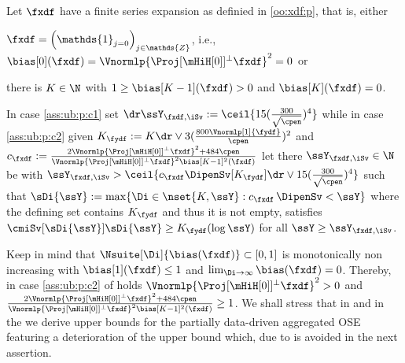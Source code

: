 \begin{as}\label{ass:ub:p}
Let $\fxdf$ have a finite series expansion as definied in \ref{oo:xdf:p}, that is, either
\begin{inparaenum}[i]\renewcommand{\theenumi}{\dgrau\rm(\alph{enumi})}
\item\label{ass:ub:p:c1}
	$\fxdf=\left(\mathds{1}_{j = 0}\right)_{j \in \mathds{Z}}$, i.e., $\bias[0](\fxdf)=\Vnormlp{\Proj[{\mHiH[0]}]^\perp\fxdf}^2=0$ or
\item\label{ass:ub:p:c2}
	there is $K\in\N$ with $1\geq \bias[{K-1}](\fxdf)>0$ and $\bias[K](\fxdf)=0$.
\end{inparaenum}
In case  \ref{ass:ub:p:c1} set $\dr\ssY_{\fxdf,\iSv}:=\ceil{15(\tfrac{300}{\sqrt{\cpen}})^4}$ while in case \ref{ass:ub:p:c2} given $K_{\fydf}:=K\dr\vee 3(\tfrac{800\Vnormlp[1]{\fydf}}{\cpen})^2$ and $c_{\fxdf}:=\tfrac{2\Vnormlp{\Proj[{\mHiH[0]}]^\perp\fxdf}^2+484\cpen}{\Vnormlp{\Proj[{\mHiH[0]}]^\perp\fxdf}^2\bias[{K-1}]^2(\fxdf)}$ let there $\ssY_{\fxdf,\iSv}\in\N$ be with $\ssY_{\fxdf,\iSv}>\ceil{c_{\fxdf}\DipenSv[K_{\fydf}]\dr\vee15(\tfrac{300}{\sqrt{\cpen}})^4}$ such that $\sDi{\ssY}:=\max\{\Di\in\nset{K,\ssY}:c_{\fxdf}\,\DipenSv<\ssY\}$ where the defining set contains $K_{\fydf}$ and thus it is not empty, satisfies $\cmiSv[\sDi{\ssY}]\sDi{\ssY}\geq K_{\fydf}(\log\ssY)$ for all $\ssY\geq \ssY_{\fxdf,\iSv}$.
\end{as}
\begin{rmk}\label{rem:ass:ub:p}
 Keep in mind that $\Nsuite[\Di]{\bias(\fxdf)}\subset[0,1]$ is monotonically non increasing with $\bias[1](\fxdf)\leq1$ and $\lim_{\Di\to\infty}\bias(\fxdf)=0$.
Thereby, in case \ref{ass:ub:p:c2} of  holds $\Vnormlp{\Proj[{\mHiH[0]}]^\perp\fxdf}^2>0$ and $\tfrac{2\Vnormlp{\Proj[{\mHiH[0]}]^\perp\fxdf}^2+484\cpen}{\Vnormlp{\Proj[{\mHiH[0]}]^\perp\fxdf}^2\bias[{K-1}]^2(\fxdf)}\geq1$.
We shall stress that in  and  in the  we derive upper bounds for the partially data-driven aggregated OSE featuring a deterioration of the upper bound which, due to  is avoided in the next assertion.
\end{rmk}
